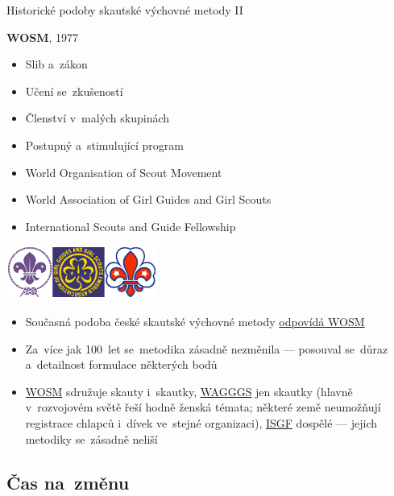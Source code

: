 \documentclass[compress, ucs, xelatex, 11pt, xcolor=dvipsnames, print, aspectratio=169,
	hyperref={
		bookmarks=true,
		unicode=true,
		colorlinks=true,
		pdftitle={Skautska vychovna metoda},
		plainpages=false,
		pdfauthor={Vojtech Zeisek},
		pdfsubject={Skautska vychovna metoda a jeji vyvoj za posledni stoleti a desetileti},
		pdfcreator={XeLaTeX},
		pdfkeywords={Junak, Pedagogika, Skaut, Skauting, Vychovna metoda},
		linkcolor=Red, %
		anchorcolor=ForestGreen, %
		citecolor=ForestGreen, %
		filecolor=ForestGreen, %
		menucolor=ForestGreen, %
		urlcolor=Sepia, %
		pdftex},
	url={hyphens, lowtilde} %
	]{beamer}
\begin{document}
\begin{frame}{Historické podoby skautské výchovné metody II}
	\begin{multicols}{2}
		\textbf{WOSM}, 1977
		\begin{itemize}
			\item Slib a~zákon
			\item Učení se~zkušeností
			\item Členství v~malých skupinách
			\item Postupný a~stimulující program
		\end{itemize}
		\columnbreak
		\begin{scriptsize}
			\begin{itemize}
				\item World Organisation of Scout Movement
				\item World Association of Girl Guides and Girl Scouts
				\item International Scouts and Guide Fellowship
			\end{itemize}
		\end{scriptsize}
		\begin{center}
			\includegraphics[height=1.75cm]{loga.png}
		\end{center}
	\end{multicols}
	\begin{itemize}
		\item Současná podoba české skautské výchovné metody \href{https://www.scout.org/who-we-are/scout-movement/scout-method}{odpovídá WOSM}
		\item Za~více jak 100~let se~metodika zásadně nezměnila --- posouval se~důraz a~detailnost formulace některých bodů
		\item \href{https://www.scout.org/}{WOSM} sdružuje skauty i~skautky, \href{https://www.wagggs.org/}{WAGGGS} jen skautky (hlavně v~rozvojovém světě řeší hodně ženská témata; některé země neumožňují registrace chlapců i~dívek ve~stejné organizaci), \href{http://www.isgf.org/}{ISGF} dospělé --- jejich metodiky se~zásadně neliší
	\end{itemize}
\end{frame}

\subsection{Čas na~změnu}
\end{document}
